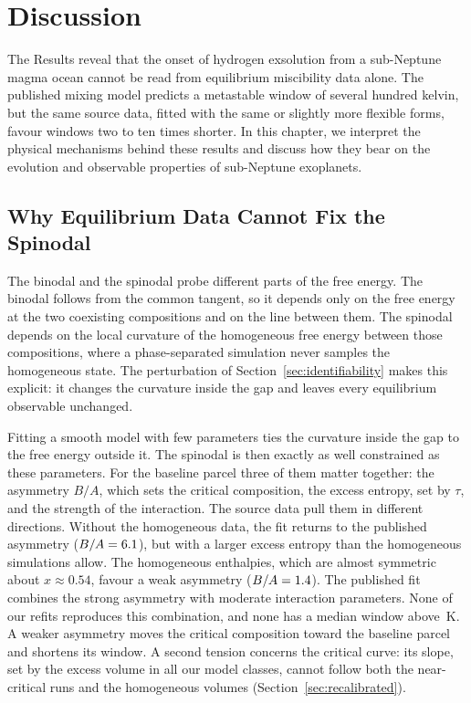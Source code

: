 \chapter{Discussion}\label{ch:discussion}

The Results reveal that the onset of hydrogen exsolution from a sub-Neptune magma ocean
cannot be read from equilibrium miscibility data alone. The published mixing model predicts
a metastable window of several hundred kelvin, but the same source data, fitted with the
same or slightly more flexible forms, favour windows two to ten times shorter. In this
chapter, we interpret the physical mechanisms behind these results and discuss how they
bear on the evolution and observable properties of sub-Neptune exoplanets.

\section{Why Equilibrium Data Cannot Fix the Spinodal}\label{sec:why}

The binodal and the spinodal probe different parts of the free energy. The binodal follows
from the common tangent, so it depends only on the free energy at the two coexisting
compositions and on the line between them. The spinodal depends on the local curvature of
the homogeneous free energy between those compositions, where a phase-separated simulation
never samples the homogeneous state. The perturbation of Section~\ref{sec:identifiability}
makes this explicit: it changes the curvature inside the gap and leaves every equilibrium
observable unchanged.

Fitting a smooth model with few parameters ties the curvature inside the gap to the free
energy outside it. The spinodal is then exactly as well constrained as these parameters. For
the baseline parcel three of them matter together: the asymmetry $B/A$, which sets the critical
composition, the excess entropy, set by $\tau$, and the strength of the interaction. The source
data pull them in different directions. Without the homogeneous data, the fit returns to the
published asymmetry ($B/A = 6.1{}$), but with a larger excess entropy than the
homogeneous simulations allow. The homogeneous enthalpies, which are almost symmetric about
$x \approx 0.54$, favour a weak asymmetry ($B/A = 1.4{}$). The published fit
combines the strong asymmetry with moderate interaction parameters. None of our refits
reproduces this combination, and none has a median window above \IntRangeHi{}\,K. A weaker asymmetry moves the critical composition toward the
baseline parcel and shortens its window. A second tension
concerns the critical curve: its slope, set by the excess volume in all our model classes,
cannot follow both the near-critical runs and the homogeneous volumes
(Section~\ref{sec:recalibrated}).

